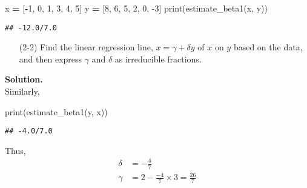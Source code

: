 \documentclass[
]{article}
\newenvironment{Shaded}{\begin{snugshade}}{\end{snugshade}}
\newcommand{\BuiltInTok}[1]{#1}
\newcommand{\DecValTok}[1]{\textcolor[rgb]{0.00,0.00,0.81}{#1}}
\newcommand{\NormalTok}[1]{#1}
\newcommand{\OperatorTok}[1]{\textcolor[rgb]{0.81,0.36,0.00}{\textbf{#1}}}
\begin{document}
\begin{Shaded}
\begin{Highlighting}[]
\NormalTok{x }\OperatorTok{=}\NormalTok{ [}\OperatorTok{-}\DecValTok{1}\NormalTok{, }\DecValTok{0}\NormalTok{, }\DecValTok{1}\NormalTok{, }\DecValTok{3}\NormalTok{, }\DecValTok{4}\NormalTok{, }\DecValTok{5}\NormalTok{]}
\NormalTok{y }\OperatorTok{=}\NormalTok{ [}\DecValTok{8}\NormalTok{, }\DecValTok{6}\NormalTok{, }\DecValTok{5}\NormalTok{, }\DecValTok{2}\NormalTok{, }\DecValTok{0}\NormalTok{, }\DecValTok{-3}\NormalTok{]}
\BuiltInTok{print}\NormalTok{(estimate_beta1(x, y))}
\end{Highlighting}
\end{Shaded}

\begin{verbatim}
## -12.0/7.0
\end{verbatim}

\begin{enumerate}
\item[(2-2)] Find the linear regression line, $x = \gamma + \delta y$ of $x$ on $y$ based on the data, and then express $\gamma$ and $\delta$ as irreducible fractions.
\end{enumerate}

\textbf{Solution.}\\
Similarly,

\begin{Shaded}
\begin{Highlighting}[]
\BuiltInTok{print}\NormalTok{(estimate_beta1(y, x))}
\end{Highlighting}
\end{Shaded}

\begin{verbatim}
## -4.0/7.0
\end{verbatim}

Thus, \[\begin{aligned}
\delta &= -\frac{4}{7} \\
\gamma &= 2 - \frac{-4}{7} \times 3 = \frac{26}{7}
\end{aligned}\]
\end{document}
